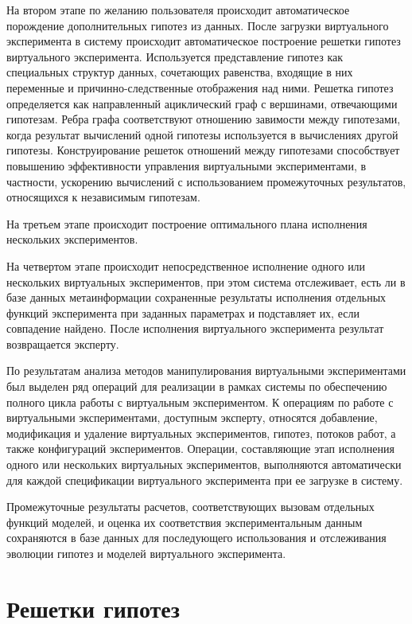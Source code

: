 На втором этапе по желанию пользователя происходит автоматическое порождение дополнительных гипотез из данных. 
После загрузки виртуального эксперимента в систему происходит автоматическое построение решетки гипотез виртуального 
эксперимента. Используется представление гипотез как специальных структур данных, сочетающих равенства, входящие в 
них переменные и причинно-следственные отображения над ними. Решетка гипотез определяется как направленный ациклический 
граф с вершинами, отвечающими гипотезам. Ребра графа соответствуют отношению завимости между гипотезами, когда 
результат вычислений одной гипотезы используется в вычислениях другой гипотезы. Конструирование решеток отношений 
между гипотезами способствует повышению эффективности управления виртуальными экспериментами, в частности, ускорению 
вычислений с использованием промежуточных результатов, относящихся к независимым гипотезам. 

На третьем этапе происходит построение оптимального плана исполнения нескольких экспериментов. 

На четвертом этапе происходит непосредственное исполнение одного или нескольких виртуальных экспериментов, при этом 
система отслеживает, есть ли в базе данных метаинформации сохраненные результаты исполнения отдельных функций 
эксперимента при заданных параметрах и подставляет их, если совпадение найдено. После исполнения виртуального 
эксперимента результат возвращается эксперту.

По результатам анализа методов манипулирования виртуальными экспериментами был выделен ряд операций для реализации 
в рамках системы по обеспечению полного цикла работы с виртуальным экспериментом. К операциям по работе с виртуальными 
экспериментами, доступным эксперту, относятся добавление, модификация и удаление виртуальных экспериментов, гипотез, 
потоков работ, а также конфигураций экспериментов. Операции, составляющие этап исполнения одного или нескольких 
виртуальных экспериментов, выполняются автоматически для каждой спецификации виртуального эксперимента при ее 
загрузке в систему. 

Промежуточные результаты расчетов, соответствующих вызовам отдельных функций моделей, и оценка их соответствия 
экспериментальным данным сохраняются в базе данных для последующего использования и отслеживания эволюции гипотез и 
моделей виртуального эксперимента.

\section{Решетки гипотез} \label{sect2_3}

